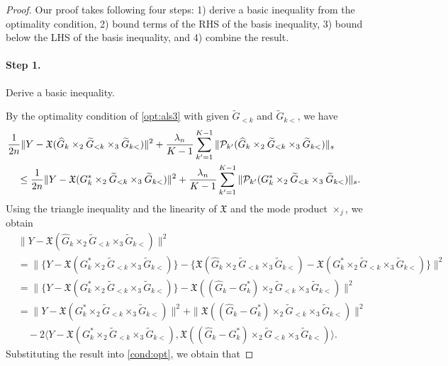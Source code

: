 \begin{proof}

Our proof takes following four steps: 1) derive a basic inequality from the optimality condition, 2) bound terms of the RHS of the basis inequality, 3) bound below the LHS of the basis inequality, and 4) combine the result.

\paragraph{Step 1.} Derive a basic inequality.

By the optimality condition of \eqref{opt:als3} with given $\tilde{G}_{<k}$ and $\tilde{G}_{k<}$, we have
\begin{align}
	 &\frac{1}{2n} \|Y - \mathfrak{X}(\widehat{G}_k \times_2 \widetilde{G}_{<k} \times_3 \widetilde{G}_{k<})\|^2 + \frac{\lambda_n}{K-1}\sum_{k'=1}^{K-1} \|\mathcal{P}_{k'}(\widehat{G}_k \times_2 \widetilde{G}_{<k} \times_3 \widetilde{G}_{k<})\|_{s}  \notag \\
	 & \quad \leq \frac{1}{2n} \|Y - \mathfrak{X}(G_k^* \times_2 \widetilde{G}_{<k} \times_3 \widetilde{G}_{k<})\|^2 + \frac{\lambda_n}{K-1}\sum_{k'=1}^{K-1} \|\mathcal{P}_{k'}(G_k^* \times_2 \widetilde{G}_{<k} \times_3 \widetilde{G}_{k<})\|_{s}. \label{cond:opt}
\end{align}
Using the triangle inequality and the linearity of $\mathfrak{X}$ and the mode product $\times_j$, we obtain 
\begin{align*}
	&\|Y - \mathfrak{X}(\hat{G}_k \times_2 \tilde{G}_{<k} \times_3 \tilde{G}_{k<})\|^2 \\
	&=\|\{Y - \mathfrak{X}(G_k^* \times_2 \tilde{G}_{<k} \times_3 \tilde{G}_{k<})\} -\{\mathfrak{X}(\hat{G}_k \times_2 \tilde{G}_{<k} \times_3 \tilde{G}_{k<}) - \mathfrak{X}(G_k^* \times_2 \tilde{G}_{<k} \times_3 \tilde{G}_{k<})\} \|^2 \\
	&= \|\{Y - \mathfrak{X}(G_k^* \times_2 \tilde{G}_{<k} \times_3 \tilde{G}_{k<})\} -\mathfrak{X}((\hat{G}_k - G_k^*) \times_2 \tilde{G}_{<k} \times_3 \tilde{G}_{k<})  \|^2 \\
	& = \|Y - \mathfrak{X}(G_k^* \times_2 \tilde{G}_{<k} \times_3 \tilde{G}_{k<})\|^2 + \| \mathfrak{X}((\hat{G}_k - G_k^*) \times_2 \tilde{G}_{<k} \times_3 \tilde{G}_{k<})  \|^2  \\
	& \quad -2 \langle Y - \mathfrak{X}(G_k^* \times_2 \tilde{G}_{<k} \times_3 \tilde{G}_{k<}), \mathfrak{X}((\hat{G}_k - G_k^*) \times_2 \tilde{G}_{<k} \times_3 \tilde{G}_{k<}) \rangle.
\end{align*}
Substituting the result into \eqref{cond:opt}, we obtain that 

\end{proof}
